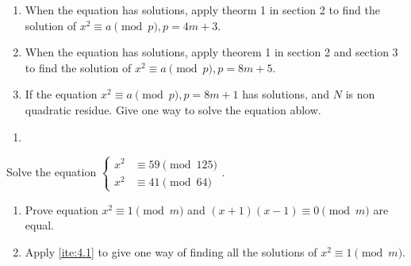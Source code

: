 \documentclass{ctexart}
\begin{document}
\begin{problem}\label{pro:2}
  \begin{enumerate}
    \item When the equation has solutions, apply theorm 1 in section 2 to
      find the solution of \(x^2 \equiv a \pmod{p}, p=4m + 3\).
    \item When the equation has solutions, apply theorem 1 in section 2 and section 3 to
      find the solution of \(x^2 \equiv a \pmod{p}, p=8m + 5\).
    \item If the equation \(x^2 \equiv a \pmod{p},p=8m + 1\) has solutions, and \(N \) is non quadratic residue.
      Give one way to solve the equation ablow.
  \end{enumerate}
  \begin{solution}
    \begin{enumerate}
      \item 
    \end{enumerate}
    
  \end{solution}
  
\end{problem}
\begin{problem}\label{pro:3}
  Solve the equation \(\begin{cases}
    x^2 & \equiv 59 \pmod{125} \\
    x^2 & \equiv 41 \pmod{64}
  \end{cases}\).
\end{problem}
\begin{problem}\label{pro:4}
  \begin{enumerate}
    \item \label{ite:4.1} Prove equation \(x^2 \equiv 1 \pmod{m}\) and \((x + 1)(x-1) \equiv 0 \pmod{m}\) are equal.
    \item Apply \ref{ite:4.1} to give one way of finding all the solutions of \(x^2 \equiv 1 \pmod{m}\).
  \end{enumerate}
\end{problem}
\end{document}
